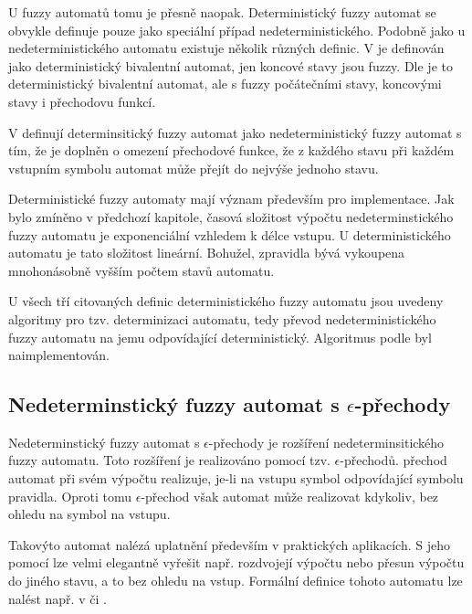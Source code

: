 \documentclass[a4paper,10pt]{article}
\begin{document}
U fuzzy automatů tomu je přesně naopak. Deterministický fuzzy automat se obvykle definuje pouze jako speciální případ nedeterministického. Podobně jako u nedeterministického automatu existuje několik různých definic. V \cite{Bel-DetFuzAut} je definován jako deterministický bivalentní automat, jen koncové stavy jsou fuzzy. Dle \cite{LiLiLi-RelAmoSevTypFuzAut} je to deterministický bivalentní automat, ale s fuzzy počátečními stavy, koncovými stavy i přechodovu funkcí.

V \cite{GonGar-FuzzLangInfRanAccGuzzAutPumLemDetProc} definují determinsitický fuzzy automat jako nedeterministický fuzzy automat s tím, že je doplněn o omezení přechodové funkce, že z každého stavu při každém vstupním symbolu automat může přejít do nejvýše jednoho stavu.

Deterministické fuzzy automaty mají význam především pro implementace. Jak bylo zmíněno v předchozí kapitole,  časová složitost výpočtu nedeterminstického fuzzy automatu je exponenciální vzhledem k délce vstupu. U deterministického automatu je tato složitost lineární. Bohužel, zpravidla bývá vykoupena mnohonásobně vyšším počtem stavů automatu.

U všech tří citovaných definic deterministického fuzzy automatu jsou uvedeny algoritmy pro tzv. determinizaci automatu, tedy převod nedeterministického fuzzy automatu na jemu odpovídající deterministický. Algoritmus podle \cite{GonGar-FuzzLangInfRanAccGuzzAutPumLemDetProc} byl naimplementován.

\subsection{Nedeterminstický fuzzy automat s $\epsilon$-přechody}
Nedeterminstický fuzzy automat s $\epsilon$-přechody je rozšíření nedeterminsitického fuzzy automatu. Toto rozšíření je realizováno pomocí tzv. $\epsilon$-přechodů.  přechod automat při svém výpočtu realizuje, je-li na vstupu symbol odpovídající symbolu pravidla. Oproti tomu $\epsilon$-přechod však automat může realizovat kdykoliv, bez ohledu na symbol na vstupu.

Takovýto automat nalézá uplatnění především v praktických aplikacích. S jeho pomocí lze velmi elegantně vyřešit např. rozdvojejí výpočtu nebo přesun výpočtu do jiného stavu, a to bez ohledu na vstup. Formální definice tohoto automatu lze nalést např. v \cite{SnaKepAbrHas-AproxStriMatchFuzzAut} či \cite{LiLiLi-RelAmoSevTypFuzAut}.
\end{document}
